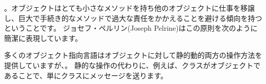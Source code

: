 \documentclass[a4paper,10pt,twoside]{book}
\begin{document}
。オブジェクトはとても小さなメソッドを持ち他のオブジェクトに仕事を移譲し、巨大で手続き的なメソッドで過大な責任をかかえることを避ける傾向を持つということです。
ジョセフ・ペルリン(Joseph Pelrine)はこの原則を次のように簡潔に表現しています。

多くのオブジェクト指向言語はオブジェクトに対して静的動的両方の操作方法を提供していますが、。
静的な操作の代わりに、例えば、クラスがオブジェクトであることで、単にクラスにメッセージを送ります。
\end{document}
